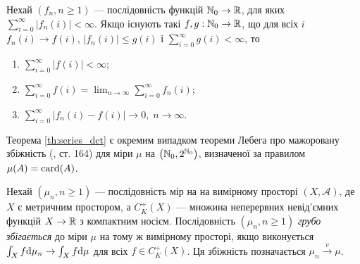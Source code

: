 \begin{theorem}\label{th:series_dct}
    Нехай $\left(f_n, n \geq 1\right)$ --- послідовність функцій 
    $\mathbb{N}_0 \to \mathbb{R}$, для яких $\sum_{i=0}^{\infty} |f_n(i)| < \infty$. Якщо
    існують такі $f, g: \mathbb{N}_0 \to \mathbb{R}$, що
    для всіх $i$ $f_n(i) \to f(i)$, $|f_n(i)| \leq g(i)$ і 
    $\sum_{i=0}^{\infty} g(i) < \infty$, то
    \begin{enumerate}
        \item $\sum_{i=0}^{\infty} |f(i)| < \infty$;
        \item $\sum_{i=0}^{\infty} f(i) = \lim_{n\to\infty} \sum_{i=0}^{\infty} f_n(i)$;
        \item $\sum_{i=0}^{\infty} \left|f_n(i) - f(i)\right| \to 0, \; n \to \infty$.
    \end{enumerate}
\end{theorem}
Теорема \ref{th:series_dct} є окремим випадком теореми Лебега про мажоровану збіжність
(\cite{Bog}, ст. 164) для міри $\mu$ на $\left(\mathbb{N}_0, 2^{\mathbb{N}_0}\right)$,
визначеної за правилом $\mu(A) = \operatorname{card}(A)$.

\begin{definition}
    Нехай $\left(\mu_n, n \geq 1\right)$ --- послідовність мір на
    на вимірному просторі $\left(X, \mathcal{A}\right)$,
    де $X$ є метричним простором,
    а $C_K^+(X)$ --- множина неперервних невід'ємних функцій
    $X \to \mathbb{R}$ з компактним носієм.
    Послідовність $\left(\mu_n, n \geq 1\right)$
    \emph{грубо збігається} до міри $\mu$ на тому ж вимірному просторі,
    якщо виконується $\int_X f \mathrm{d}\mu_n \to \int_X f \mathrm{d}\mu$ для всіх $f \in C_K^+(X)$.
    Ця збіжність позначається $\mu_n \overset{v}{\longrightarrow} \mu$.
\end{definition}

